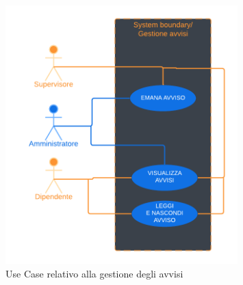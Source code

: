         \begin{figure}[H]
            \centering
            \includegraphics[width=0.8\textwidth]{assets/diagrammi/Use-Case/Gestione avvisi.png}
            \caption{Use Case relativo alla gestione degli avvisi}
            \label{fig:ucdAdvMgmt}
        \end{figure}
\newpage